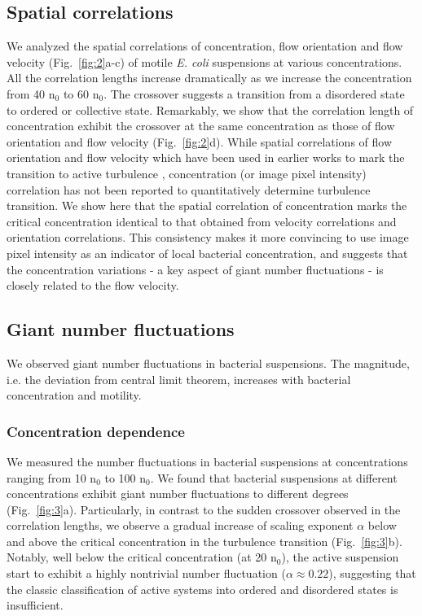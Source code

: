 \documentclass[twocolumn,aps,pre,amsmath,amssymb,floatfix,longbibliography]{revtex4-1}
\begin{document}
\subsection{Spatial correlations}
We analyzed the spatial correlations of concentration, flow orientation and flow velocity (Fig.~\ref{fig:2}a-c) of motile \textit{E. coli} suspensions at various concentrations. All the correlation lengths increase dramatically as we increase the concentration from 40 n$_0$ to 60 n$_0$. The crossover suggests a transition from a disordered state to ordered or collective state. Remarkably, we show that the correlation length of concentration exhibit the crossover at the same concentration as those of flow orientation and flow velocity (Fig.~\ref{fig:2}d). While spatial correlations of flow orientation and flow velocity which have been used in earlier works to mark the transition to active turbulence \cite{Wensink14308, PhysRevLett.110.228102}, concentration (or image pixel intensity) correlation has not been reported to quantitatively determine turbulence transition. We show here that the spatial correlation of concentration marks the critical concentration identical to that obtained from velocity correlations and orientation correlations. This consistency makes it more convincing to use image pixel intensity as an indicator of local bacterial concentration, and suggests that the concentration variations - a key aspect of giant number fluctuations - is closely related to the flow velocity.

\subsection{Giant number fluctuations}
We observed giant number fluctuations in bacterial suspensions. The magnitude, i.e. the deviation from central limit theorem, increases with bacterial concentration and motility.

\subsubsection{Concentration dependence}
We measured the number fluctuations in bacterial suspensions at concentrations ranging from 10 n$_0$ to 100 n$_0$.
 We found that bacterial suspensions at different concentrations exhibit giant number fluctuations to different degrees (Fig.~\ref{fig:3}a). Particularly, in contrast to the sudden crossover observed in the correlation lengths, we observe a gradual increase of scaling exponent $\alpha$ below and above the critical concentration in the turbulence transition (Fig.~\ref{fig:3}b). Notably, well below the critical concentration (at 20 n$_0$), the active suspension start to exhibit a highly nontrivial number fluctuation ($\alpha\approx0.22$), suggesting that the classic classification of active systems into ordered and disordered states is insufficient.
\end{document}
